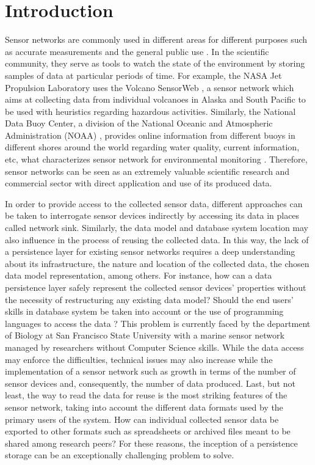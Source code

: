 


\chapter{Introduction}

Sensor networks are commonly used in different areas for different purposes
such as accurate measurements and the general public use \cite{sn-intro01}
\cite{sn-intro02}. In the scientific community, they serve as tools to watch
the state of the environment by storing samples of data at particular periods
of time. For example, the NASA Jet Propulsion Laboratory uses the Volcano
SensorWeb \cite{sn-ex02}, a sensor network which aims at collecting data from
individual volcanoes in Alaska and South Pacific to be used with heuristics
regarding hazardous activities. Similarly, the National Data Buoy Center, a
division of the National Oceanic and Atmospheric Administration (NOAA)
\cite{sn-ex03}, provides online information from different buoys in different
shores around the world regarding water quality, current information, etc,
what characterizes sensor network for environmental monitoring \cite{sn-ex01}.
Therefore, sensor networks can be seen as an extremely valuable scientific
research and commercial sector with direct application and use of its produced
data.

In order to provide access to the collected sensor data, different approaches
can be taken to interrogate sensor devices indirectly by accessing its data in
places called network sink. Similarly, the data model and database system
location may also influence in the process of reusing the collected data. In
this way, the lack of a persistence layer for existing sensor networks requires
a deep understanding about its infrastructure, the nature and location of the
collected data, the chosen data model representation, among others. For
instance, how can a data persistence layer safely represent the collected
sensor devices’ properties without the necessity of restructuring any existing
data model? Should the end users’ skills in database system be taken into
account or the use of programming languages to access the data
\cite{sn-programming-language}? This problem is currently faced by the
department of Biology at San Francisco State University with a marine sensor
network managed by researchers without Computer Science skills. While the data
access may enforce the difficulties, technical issues may also increase while
the implementation of a sensor network such as growth in terms of the number of
sensor devices and, consequently, the number of data produced. Last, but not
least, the way to read the data for reuse is the most striking features of the
sensor network, taking into account the different data formats used by the
primary users of the system. How can individual collected sensor data be
exported to other formats such as spreadsheets or archived files meant to be
shared among research peers? For these reasons, the inception of a persistence
storage can be an exceptionally challenging problem to solve.

